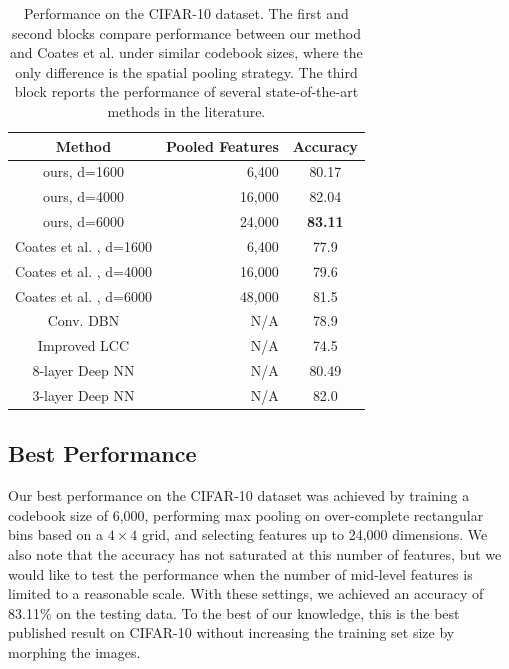\begin{table}
  \begin{minipage}[c]{1\linewidth}
  \begin{center}
  \begin{tabular}{c|r|c}
    \hline
    Method & Pooled Features & Accuracy \\
    \hline
    ours, d=1600 & 6,400 & 80.17 \\
    ours, d=4000 & 16,000 & 82.04 \\
    ours, d=6000 & 24,000 & {\bfseries 83.11}\\
    \hline
    Coates et al. \cite{coates2010aistats}, d=1600 & 6,400 & 77.9\phantom{0} \\
    Coates et al. \cite{coates2010aistats}, d=4000 & 16,000 & 79.6\phantom{0} \\
    Coates et al. \cite{coates2011icml}, d=6000 & 48,000 & 81.5\phantom{0}\\
    \hline
    Conv. DBN \cite{Krizhevsky2010} & N/A & 78.9\phantom{0} \\
    Improved LCC \cite{Yu:2010wu} & N/A & 74.5\phantom{0} \\
    8-layer Deep NN \cite{2011arXiv1102.0183C} & N/A & 80.49 \\
    3-layer Deep NN \cite{coates2011selecting} & N/A & 82.0\phantom{0} \\
    \hline
  \end{tabular}
  \end{center}
  \end{minipage}
  \caption{Performance on the CIFAR-10 dataset. The first and second blocks compare performance between our method and Coates et al. \cite{coates2010aistats,coates2011icml} under similar codebook sizes, where the only difference is the spatial pooling strategy. The third block reports the performance of several state-of-the-art methods in the literature.}\label{table:cifar10}
\end{table}

\subsection{Best Performance}
Our best performance on the CIFAR-10 dataset was achieved by training a codebook size of 6,000, performing max pooling on over-complete rectangular bins based on a $4\times4$ grid, and selecting features up to 24,000 dimensions. We also note that the accuracy has not saturated at this number of features, but we would like to test the performance when the number of mid-level features is limited to a reasonable scale. With these settings, we achieved an accuracy of 83.11\% on the testing data. To the best of our knowledge, this is the best published result on CIFAR-10 without increasing the training set size by morphing the images. 

